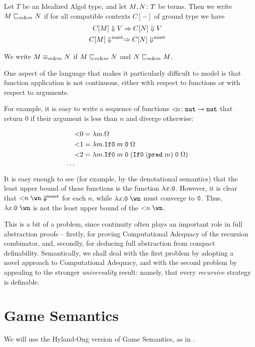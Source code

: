 \documentclass[sigplan,10pt,review]{acmart}\settopmatter{printfolios=true,printccs=false,printacmref=false}
\begin{document}
Let $T$ be an Idealized Algol type, and let $M,N\colon T$ be terms.  
Then we write $M\sqsubseteq_{m\&m} N$ if for all compatible contexts $C[-]$ of ground type we have
\begin{gather*}
  C[M]\Downarrow V \Rightarrow C[N] \Downarrow V\\
  C[M]\Downarrow^{\text{must}} \Rightarrow C[N] \Downarrow^{\text{must}}
\end{gather*}

We write $M\equiv_{m\&m} N$ if $M\sqsubseteq_{m\&m} N$ and $N\sqsubseteq_{m\&m} M$.

One aspect of the language that makes it particularly difficult to model is that function application is not continuous, either with respect to functions or with respect to arguments.  

For example, it is easy to write a sequence of functions ${<}\!n \colon {\mathtt{nat}} \to {\mathtt{nat}}$ that return $0$ if their argument is less than $n$ and diverge otherwise:

\begin{align*}
  &{<}0 = \lambda m.\Omega \\
  &{<}1 = \lambda m.{\mathtt{If0}\;} m\;{\mathtt{0}}\;\Omega \\
  &{<}2 = \lambda m.{\mathtt{If0}\;} m\;{\mathtt{0}}\;({\mathtt{If0}\;} ({\mathtt{pred\;}} m)\;{\mathtt{0}}\;\Omega)\\
  \cdots
\end{align*}
It is easy enough to see (for example, by the denotational semantics) that the least upper bound of these functions is the function $\lambda x.{\mathtt{0}}$.  
However, it is clear that ${<}n\;\wn\not\mustconverge$ for each $n$, while $\lambda x.\0\;\wn$ must converge to ${\mathtt{0}}$.  
Thus, $\lambda x.\0\;\wn$ is not the least upper bound of the ${<}n\;\wn$.

This is a bit of a problem, since continuity often plays an important role in full abstraction proofs -- firstly, for proving Computational Adequacy of the recursion combinator, and, secondly, for deducing full abstraction from compact definability.  
Semantically, we shall deal with the first problem by adopting a novel approach to Computational Adequacy, and with the second problem by appealing to the stronger \emph{universality} result: namely, that every \emph{recursive} strategy is definable.

\section{Game Semantics}

We will use the Hyland-Ong version of Game Semantics, as in \cite{SamsonGuyIAPassive}.
\end{document}
